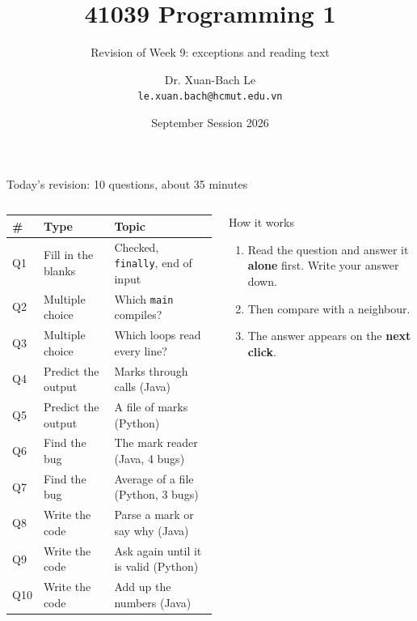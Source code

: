 \documentclass[aspectratio=169]{beamer}
\title[41039 Programming 1 --- Revision of Week 9]{41039 Programming 1}
\subtitle{Revision of Week 9: exceptions and reading text}
\author{Dr. Xuan-Bach Le\\ \small\texttt{le.xuan.bach@hcmut.edu.vn}}
\institute{\small Faculty of Computer Science and Engineering, HCMUT}
\date{September Session 2026}
\newcommand{\code}[1]{\texttt{#1}}
\begin{document}
\begin{frame}[plain]
  \titlepage
\end{frame}

\begin{frame}{Today's revision: 10 questions, about 35 minutes}
  \begin{columns}[T,onlytextwidth]
    {\small
    \renewcommand{\arraystretch}{1.18}
    \begin{tabular}{@{}l@{\hspace{0.8em}}l@{\hspace{0.8em}}l@{}}
      \toprule
      \textbf{\#} & \textbf{Type} & \textbf{Topic}\\
      \midrule
      Q1  & Fill in the blanks & Checked, \code{finally}, end of input\\
      Q2  & Multiple choice    & Which \code{main} compiles?\\
      Q3  & Multiple choice    & Which loops read every line?\\
      Q4  & Predict the output & Marks through calls (Java)\\
      Q5  & Predict the output & A file of marks (Python)\\
      Q6  & Find the bug       & The mark reader (Java, 4 bugs)\\
      Q7  & Find the bug       & Average of a file (Python, 3 bugs)\\
      Q8  & Write the code     & Parse a mark or say why (Java)\\
      Q9  & Write the code     & Ask again until it is valid (Python)\\
      Q10 & Write the code     & Add up the numbers (Java)\\
      \bottomrule
    \end{tabular}}
    \begin{discussionbox}{How it works}
      \small\raggedright
      \begin{enumerate}[itemsep=0.3em, topsep=0.1em, leftmargin=1.2em]
        \item Read the question and answer it \textbf{alone} first. Write your answer
              down.
        \item Then compare with a neighbour.
        \item The answer appears on the \textbf{next click}.
      \end{enumerate}
    \end{discussionbox}
  \end{columns}
\end{frame}
\end{document}
